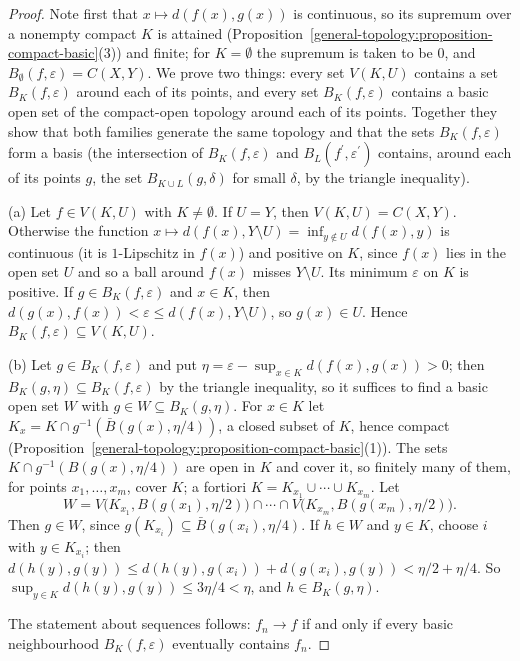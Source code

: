 \begin{proof}
Note first that $x \mapsto d(f(x), g(x))$ is continuous, so its supremum over a nonempty compact $K$ is attained (Proposition~\ref{general-topology:proposition-compact-basic}(3)) and finite; for $K = \emptyset$
the supremum is taken to be $0$, and $B_\emptyset(f, \varepsilon) = C(X, Y)$. We prove two things: every set $V(K, U)$ contains a set $B_K(f, \varepsilon)$ around each of its points, and every set
$B_K(f, \varepsilon)$ contains a basic open set of the compact-open topology around each of its points. Together they show that both families generate the same topology and that the sets $B_K(f, \varepsilon)$
form a basis (the intersection of $B_K(f, \varepsilon)$ and $B_L(f^{\prime}, \varepsilon^{\prime})$ contains, around each of its points $g$, the set $B_{K \cup L}(g, \delta)$ for small $\delta$, by the triangle inequality).

(a) Let $f \in V(K, U)$ with $K \neq \emptyset$. If $U = Y$, then $V(K, U) = C(X, Y)$. Otherwise the function $x \mapsto d(f(x), Y \setminus U) = \inf_{y \notin U}d(f(x), y)$ is continuous
(it is $1$-Lipschitz in $f(x)$) and positive on $K$, since $f(x)$ lies in the open set $U$ and so a ball around $f(x)$ misses $Y \setminus U$. Its minimum $\varepsilon$ on $K$ is positive. If
$g \in B_K(f, \varepsilon)$ and $x \in K$, then $d(g(x), f(x)) < \varepsilon \leq d(f(x), Y \setminus U)$, so $g(x) \in U$. Hence $B_K(f, \varepsilon) \subseteq V(K, U)$.

(b) Let $g \in B_K(f, \varepsilon)$ and put $\eta = \varepsilon - \sup_{x \in K}d(f(x), g(x)) > 0$; then $B_K(g, \eta) \subseteq B_K(f, \varepsilon)$ by the triangle inequality, so it suffices to find a basic
open set $W$ with $g \in W \subseteq B_K(g, \eta)$. For $x \in K$ let $K_x = K \cap g^{-1}(\bar{B}(g(x), \eta/4))$, a closed subset of $K$, hence compact
(Proposition~\ref{general-topology:proposition-compact-basic}(1)). The sets $K \cap g^{-1}(B(g(x), \eta/4))$ are open in $K$ and cover it, so finitely many of them, for points $x_1, \ldots, x_m$,
cover $K$; a fortiori $K = K_{x_1} \cup \cdots \cup K_{x_m}$. Let
\[
W = V\bigl(K_{x_1}, B(g(x_1), \eta/2)\bigr) \cap \cdots \cap V\bigl(K_{x_m}, B(g(x_m), \eta/2)\bigr).
\]
Then $g \in W$, since $g(K_{x_i}) \subseteq \bar{B}(g(x_i), \eta/4)$. If $h \in W$ and $y \in K$, choose $i$ with $y \in K_{x_i}$; then
$d(h(y), g(y)) \leq d(h(y), g(x_i)) + d(g(x_i), g(y)) < \eta/2 + \eta/4$. So $\sup_{y \in K}d(h(y), g(y)) \leq 3\eta/4 < \eta$, and $h \in B_K(g, \eta)$.

The statement about sequences follows: $f_n \to f$ if and only if every basic neighbourhood $B_K(f, \varepsilon)$ eventually contains $f_n$.
\end{proof}

